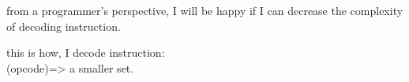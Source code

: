 \documentclass{article}
\begin{document}
    from a programmer's perspective, I will be happy if I can
decrease the complexity of decoding instruction.\par
    this is how, I decode instruction:\\
    (opcode)=> a smaller set.
\end{document}
